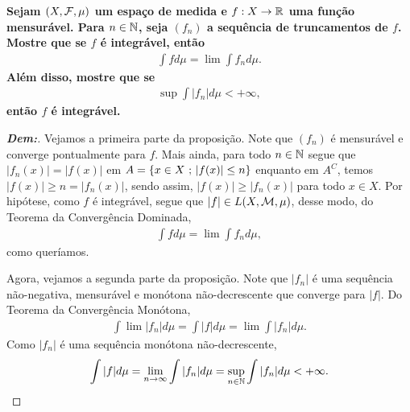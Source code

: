 \textbf{Sejam $(X, \mathcal F, \mu)$ um espaço de medida e $f: X \rightarrow \mathbb R$ uma função mensurável. 
Para $n \in \mathbb N$, seja $(f_n)$ a sequência de truncamentos de $f$. Mostre que se $f$ é integrável, então 
\begin{align*}
  \int f d\mu = \lim \int f_n d\mu.
\end{align*}
Além disso, mostre que se 
\begin{align*}
  \sup \int |f_n| d\mu < +\infty,
\end{align*}
então $f$ é integrável.}
\begin{proof}[\textbf{Dem:}] Vejamos a primeira parte da proposição. 
  Note que $(f_n)$ é mensurável e converge pontualmente 
  para $f$. Mais ainda, para todo $n \in \mathbb N$ segue que 
  $|f_n(x)| = |f(x)|$ em $A = \{x \in X \text{ ; } |f(x)|\le n\}$ enquanto em $A^C$,
  temos $|f(x)|\ge n = |f_n(x)|$, sendo assim, $|f(x)| \ge |f_n(x)|$ para 
  todo $x \in X$. Por hipótese, como $f$ é integrável, segue que 
  $|f| \in L(X, \mathcal M, \mu)$, desse modo, do Teorema da Convergência Dominada,
  \begin{align*}
    \int f d\mu = \lim \int f_n d\mu, 
  \end{align*}
  como queríamos. 

  Agora, vejamos a segunda parte da proposição. Note que $|f_n|$ é uma sequência não-negativa, 
  mensurável e monótona não-decrescente que converge para $|f|$. Do Teorema da  
  Convergência Monótona, 
  \begin{align*}
    \int \lim |f_n| d\mu = \int |f| d\mu = \lim \int |f_n| d\mu. 
  \end{align*}
  Como $|f_n|$ é uma sequência monótona não-decrescente, 
  \begin{align*}
    \int |f| d\mu = \lim_{n \rightarrow \infty} \int |f_n| d\mu 
    = \sup_{n \in \mathbb N} \int |f_n| d\mu < +\infty.
  \end{align*}
\end{proof}

